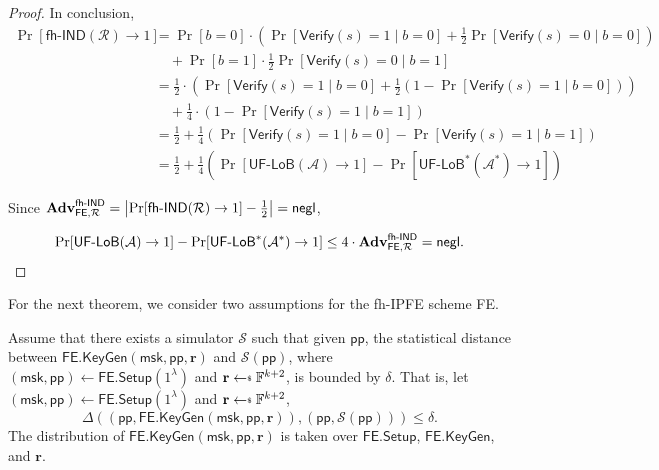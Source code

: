 \begin{proof}
In conclusion,
\begin{align*}
	\Pr[\textsf{fh-IND}(\mathcal{R}) \to 1]
	&= \Pr[b = 0] \cdot \left( \Pr[\textsf{Verify}(s) = 1 \mid b = 0] + \frac{1}{2} \Pr[\textsf{Verify}(s) = 0 \mid b = 0] \right)  \\
	&\quad + \Pr[b = 1] \cdot \frac{1}{2} \Pr[\textsf{Verify}(s) = 0 \mid b = 1] \\
	&= \frac{1}{2} \cdot \left ( \Pr[\textsf{Verify}(s) = 1 \mid b = 0] + \frac{1}{2} (1 - \Pr[\textsf{Verify}(s) = 1 \mid b = 0]) \right) \\
	& \quad +  \frac{1}{4} \cdot (1 - \Pr[\textsf{Verify}(s) = 1 \mid b = 1]) \\
	&= \frac{1}{2} + \frac{1}{4} \left( \Pr[\textsf{Verify}(s) = 1 \mid b = 0] - \Pr[\textsf{Verify}(s) = 1 \mid b = 1] \right) \\
	&= \frac{1}{2} + \frac{1}{4} \left( \Pr[\textsf{UF-LoB}(\mathcal{A}) \to 1] - \Pr[ \textsf{UF-LoB}^*(\mathcal{A}^*) \to 1 ] \right)
\end{align*}

\noindent Since $\mathbf{Adv}_{\textsf{FE}, \mathcal{R}}^\textsf{fh-IND} = \left| \Pr[\textsf{fh-IND}(\mathcal{R}) \to 1 ] - \frac{1}{2} \right| = \mathsf{negl}$,

\[
	\Pr[\textsf{UF-LoB}(\mathcal{A}) \to 1] - \Pr[ \textsf{UF-LoB}^*(\mathcal{A}^*) \to 1 ] \leq 4 \cdot \mathbf{Adv}_{\textsf{FE}, \mathcal{R}}^\textsf{fh-IND} = \mathsf{negl}.
\]

\end{proof}

For the next theorem, we consider two assumptions for the fh-IPFE scheme \textsf{FE}.

\begin{assumption}
\label{assump:ind-uf-lob:simulator}
	Assume that there exists a simulator $\mathcal{S}$ such that given $\textsf{pp}$, the statistical distance between $\textsf{FE.KeyGen}(\textsf{msk}, \textsf{pp}, \mathbf{r})$ and $\mathcal{S}(\textsf{pp})$, where $(\textsf{msk}, \textsf{pp}) \gets \textsf{FE.Setup}(1^\lambda)$ and $\mathbf{r} \getsdollar \mathbb{F}^{k+2}$, is bounded by $\delta$.
	That is, let $(\textsf{msk}, \textsf{pp}) \gets \textsf{FE.Setup}(1^\lambda)$ and $\mathbf{r} \getsdollar \mathbb{F}^{k+2}$,
	\[
		\Delta \left( (\textsf{pp}, \textsf{FE.KeyGen}(\textsf{msk}, \textsf{pp}, \mathbf{r})), (\textsf{pp}, \mathcal{S}(\textsf{pp}) ) \right) \leq \delta.
	\]
	The distribution of $\textsf{FE.KeyGen}(\textsf{msk}, \textsf{pp}, \mathbf{r})$ is taken over $\textsf{FE.Setup}$, $\textsf{FE.KeyGen}$, and $\mathbf{r}$.

\end{assumption}


